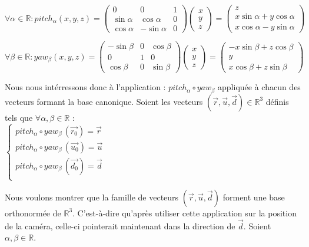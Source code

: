 \[ \forall \alpha \in \mathbb{R} : 
pitch_{\alpha}(x,y,z) = 
\begin{pmatrix}  0 & 0 & 1  \\ \sin\alpha & \cos\alpha & 0 \\ \cos\alpha & -\sin\alpha & 0 \end{pmatrix}
\begin{pmatrix} x \\ y \\ z \end{pmatrix}
= 
\begin{pmatrix} z \\ x\sin\alpha + y\cos\alpha  \\ x\cos\alpha - y\sin\alpha \end{pmatrix}
\]

\[ \forall \beta \in \mathbb{R} : 
yaw_{\beta}(x,y,z) = 
\begin{pmatrix} -\sin\beta & 0 & \cos\beta \\ 0 & 1 & 0 \\ \cos\beta & 0 & \sin\beta \end{pmatrix}
\begin{pmatrix} x \\ y \\ z \end{pmatrix}
= 
\begin{pmatrix} -x\sin\beta + z\cos\beta \\ y \\ x\cos\beta + z\sin\beta \end{pmatrix}
\]

Nous nous intérressons donc à l'application : $pitch_{\alpha} \circ yaw_{\beta}$ appliquée à chacun des vecteurs formant la base canonique. Soient les vecteurs $(\vec{r}, \vec{u}, \vec{d}) \in \mathbb{R}^3$ définis tels que $\forall \alpha, \beta \in \mathbb{R}$ : \\
$ \begin{cases}
pitch_{\alpha} \circ yaw_{\beta} \, (\vec{r_0}) = \vec{r} \\
pitch_{\alpha} \circ yaw_{\beta} \, (\vec{u_0}) = \vec{u} \\
pitch_{\alpha} \circ yaw_{\beta} \, (\vec{d_0}) = \vec{d} \\
\end{cases}$

Nous voulons montrer que la famille de vecteurs $(\vec{r}, \vec{u}, \vec{d})$ forment une base orthonormée de $\mathbb{R}^3$. C'est-à-dire qu'après utiliser cette application sur la position de la caméra, celle-ci pointerait maintenant dans la direction de $\vec{d}$. Soient $\alpha, \beta \in \mathbb{R}$.

